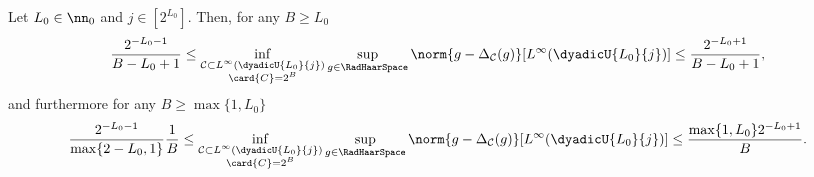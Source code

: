 \documentclass[twoside,11pt]{article}
\newcommand{\set}[1]{\ensuremath{\mathcal{#1}}}
\begin{document}
\begin{theorem}
    Let $L_0\in\nn_0$ and $j\in[2^{L_0}]$.
    Then, for any
    $B\geq L_0$ 
    \begin{align}
        \frac{2^{-L_0-1}}{B-L_0+1}
        \leq
        \inf_{\substack{\set{C}\subset L^\infty(\dyadicU{L_0}{j})\\\card{C}=2^B}}
        \sup_{g\in\RadHaarSpace}
        \norm{g-\Delta_\set{C}(g)}[L^\infty(\dyadicU{L_0}{j})]
        \leq
        \frac{2^{-L_0+1}}{B-L_0+1},
    \end{align}
    and furthermore for any $B\geq \max\{1,L_0\}$
    \begin{align}
        \frac{2^{-L_0-1}}{\max\{2-L_0,1\}}\frac{1}{B}
        \leq
        \inf_{\substack{\set{C}\subset L^\infty(\dyadicU{L_0}{j})\\\card{C}=2^B}}
        \sup_{g\in\RadHaarSpace}
        \norm{g-\Delta_\set{C}(g)}[L^\infty(\dyadicU{L_0}{j})]
        \leq
        \frac{\max\{1,L_0\}2^{-L_0+1}}{B}.
    \end{align}
\end{theorem}
\end{document}
